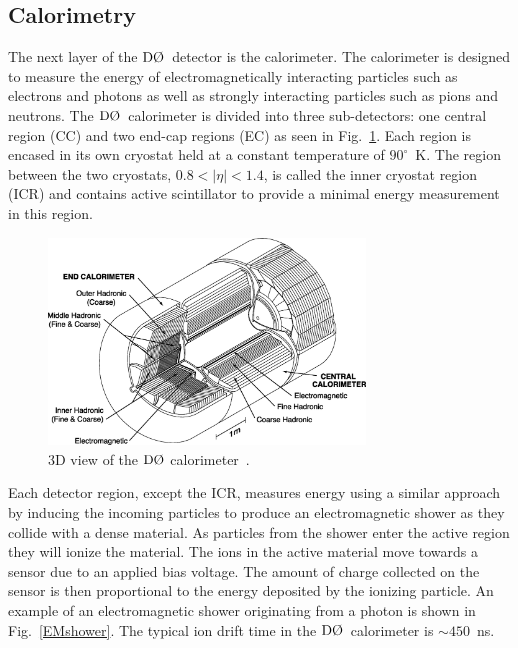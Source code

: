 \subsection{Calorimetry}
\label{calorimetry}

The next layer of the $\dzero$~detector is the calorimeter. The calorimeter is designed to measure the energy of electromagnetically interacting particles such as electrons and photons as well as strongly interacting particles such as pions and neutrons. The $\dzero$~calorimeter is divided into three sub-detectors: one central region (CC) and two end-cap regions (EC) as seen in Fig.~\ref{Calorimeter}. Each region is encased in its own cryostat held at a constant temperature of $90^{\circ}$~K. The region between the two cryostats, $0.8 < |\eta| < 1.4$, is called the inner cryostat region (ICR) and contains active scintillator to provide a minimal energy measurement in this region.

\begin{figure}[!h!tbp]
\begin{center}
\includegraphics[width=0.75\textwidth]{eps/D0/Calorimeter.eps}
\end{center}
\vspace{-0.1in}
\caption{3D view of the $\dzero$ calorimeter~\cite{Abazov:2005pn}.}
\label{Calorimeter}
\end{figure}

Each detector region, except the ICR, measures energy using a similar approach by inducing the incoming particles to produce an electromagnetic shower as they collide with a dense material. As particles from the shower enter the active region they will ionize the material. The ions in the active material move towards a sensor due to an applied bias voltage. The amount of charge collected on the sensor is then proportional to the energy deposited by the ionizing particle. An example of an electromagnetic shower originating from a photon is shown in Fig.~\ref{EMshower}.  The typical ion drift time in the $\dzero$~calorimeter is $\sim450$~ns.



